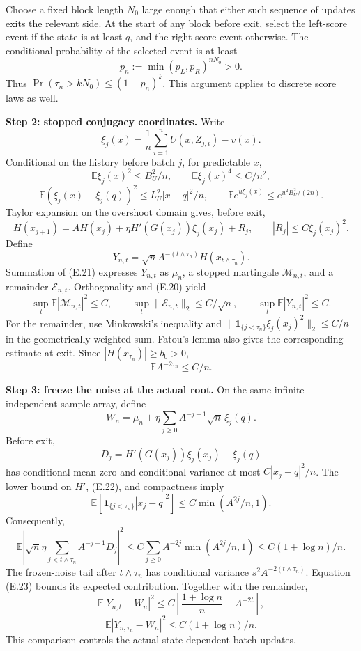 Choose a fixed block length \(N_0\) large enough that either such
sequence of updates exits the relevant side. At the start of any block
before exit, select the left-score event if the state is at least \(q\),
and the right-score event otherwise. The conditional probability of the
selected event is at least \[
p_n:=\min(p_L,p_R)^{nN_0}>0.
\] Thus \(\Pr(\tau_n>kN_0)\le(1-p_n)^k\). This argument applies to
discrete score laws as well.

\textbf{Step 2: stopped conjugacy coordinates.} Write \[
\xi_j(x)=\frac1n\sum_{i=1}^n U(x,Z_{j,i})-v(x).
\] Conditional on the history before batch \(j\), for predictable \(x\),
\[
\mathbb E\xi_j(x)^2\le B_U^2/n,\qquad
\mathbb E\xi_j(x)^4\le C/n^2,
\] \[
\mathbb E(\xi_j(x)-\xi_j(q))^2\le L_U^2|x-q|^2/n,
\qquad
\mathbb E e^{u\xi_j(x)}\le e^{u^2B_U^2/(2n)}.
\tag{E.20}
\] Taylor expansion on the overshoot domain gives, before exit, \[
H(x_{j+1})=AH(x_j)+
\eta H'(G(x_j))\xi_j(x_j)+R_j,
\qquad |R_j|\le C\xi_j(x_j)^2.
\tag{E.21}
\] Define \[
Y_{n,t}=\sqrt n A^{-(t\wedge\tau_n)}
H(x_{t\wedge\tau_n}).
\] Summation of (E.21) expresses \(Y_{n,t}\) as \(\mu_n\), a stopped
martingale \(\mathcal M_{n,t}\), and a remainder \(\mathcal E_{n,t}\).
Orthogonality and (E.20) yield \[
\sup_t\mathbb E|\mathcal M_{n,t}|^2\le C,\qquad
\sup_t\|\mathcal E_{n,t}\|_2\le C/\sqrt n,
\qquad \sup_t\mathbb E|Y_{n,t}|^2\le C.
\tag{E.22}
\] For the remainder, use Minkowski's inequality and
\(\|\mathbf1_{\{j<\tau_n\}}\xi_j(x_j)^2\|_2\le C/n\) in the
geometrically weighted sum. Fatou's lemma also gives the corresponding
estimate at exit. Since \(|H(x_{\tau_n})|\ge b_0>0\), \[
\mathbb E A^{-2\tau_n}\le C/n.
\tag{E.23}
\]

\textbf{Step 3: freeze the noise at the actual root.} On the same
infinite independent sample array, define \[
W_n=\mu_n+\eta\sum_{j\ge0}A^{-j-1}\sqrt n\,\xi_j(q).
\tag{E.24}
\] Before exit, \[
D_j=H'(G(x_j))\xi_j(x_j)-\xi_j(q)
\] has conditional mean zero and conditional variance at most
\(C|x_j-q|^2/n\). The lower bound on \(H'\), (E.22), and compactness
imply \[
\mathbb E[\mathbf1_{\{j<\tau_n\}}|x_j-q|^2]
\le C\min(A^{2j}/n,1).
\tag{E.25}
\] Consequently, \[
\mathbb E\left|
\sqrt n\eta\sum_{j<t\wedge\tau_n}A^{-j-1}D_j
\right|^2
\le C\sum_{j\ge0}A^{-2j}\min(A^{2j}/n,1)
\le C(1+\log n)/n.
\tag{E.26}
\] The frozen-noise tail after \(t\wedge\tau_n\) has conditional
variance \(s^2A^{-2(t\wedge\tau_n)}\). Equation (E.23) bounds its
expected contribution. Together with the remainder, \[
\mathbb E|Y_{n,t}-W_n|^2
\le C\left[\frac{1+\log n}{n}+A^{-2t}\right],
\] \[
\mathbb E|Y_{n,\tau_n}-W_n|^2
\le C(1+\log n)/n.
\tag{E.27}
\] This comparison controls the actual state-dependent batch updates.

